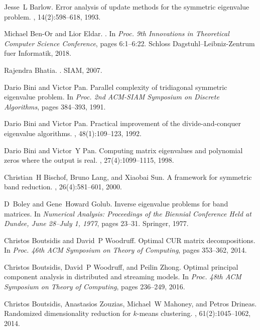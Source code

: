 \documentclass{article}
\begin{document}
\begin{thebibliography}{10}
Jesse~L Barlow.
\newblock Error analysis of update methods for the symmetric eigenvalue problem.
, 14(2):598--618, 1993.

Michael Ben-Or and Lior Eldar.
.
\newblock In {\em Proc. 9th Innovations in Theoretical Computer Science Conference}, pages 6:1--6:22. Schloss Dagstuhl--Leibniz-Zentrum fuer Informatik, 2018.

Rajendra Bhatia.
.
\newblock SIAM, 2007.

Dario Bini and Victor Pan.
\newblock Parallel complexity of tridiagonal symmetric eigenvalue problem.
\newblock In {\em Proc. 2nd ACM-SIAM Symposium on Discrete Algorithms}, pages 384--393, 1991.

Dario Bini and Victor Pan.
\newblock Practical improvement of the divide-and-conquer eigenvalue algorithms.
, 48(1):109--123, 1992.

Dario Bini and Victor~Y Pan.
\newblock Computing matrix eigenvalues and polynomial zeros where the output is real.
, 27(4):1099--1115, 1998.

Christian~H Bischof, Bruno Lang, and Xiaobai Sun.
\newblock A framework for symmetric band reduction.
, 26(4):581--601, 2000.

D~Boley and Gene~Howard Golub.
\newblock Inverse eigenvalue problems for band matrices.
\newblock In {\em Numerical Analysis: Proceedings of the Biennial Conference Held at Dundee, June 28--July 1, 1977}, pages 23--31. Springer, 1977.

Christos Boutsidis and David~P Woodruff.
\newblock Optimal {CUR} matrix decompositions.
\newblock In {\em Proc. 46th ACM Symposium on Theory of Computing}, pages 353--362, 2014.

Christos Boutsidis, David~P Woodruff, and Peilin Zhong.
\newblock Optimal principal component analysis in distributed and streaming models.
\newblock In {\em Proc. 48th ACM Symposium on Theory of Computing}, pages 236--249, 2016.

Christos Boutsidis, Anastasios Zouzias, Michael~W Mahoney, and Petros Drineas.
\newblock Randomized dimensionality reduction for $ k $-means clustering.
, 61(2):1045--1062, 2014.


\end{thebibliography}
\end{document}
